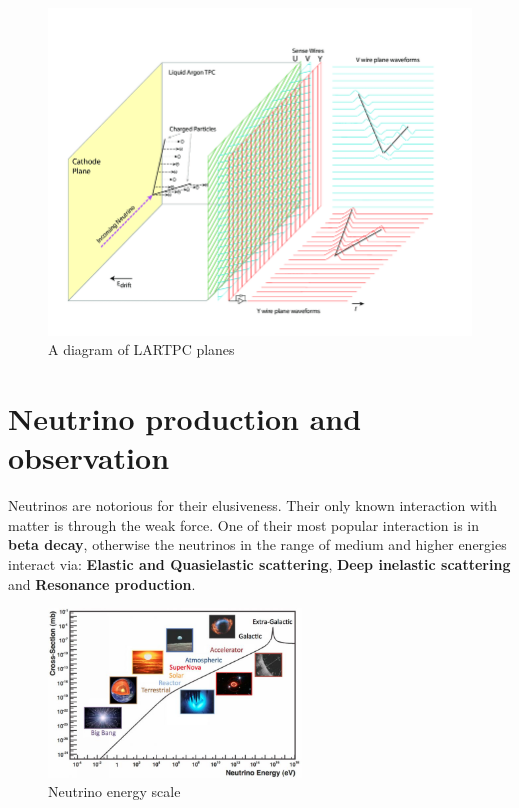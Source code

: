 \begin{figure}[H]
\centering
\includegraphics[width=8.\textwidth]{figures/chapter6/Operational-principle-of-the-MicroBooNE-LArTPC.png}
\caption{A diagram of LARTPC planes \cite{microboone}}
\label{fig:lartpc-grids}
\end{figure}

\section{Neutrino production and observation}

Neutrinos are notorious for their elusiveness. Their only known interaction with matter is through the weak force.
One of their most popular interaction is in \textbf{beta decay}, otherwise the neutrinos in the range of medium and higher energies interact via: \textbf{Elastic and Quasielastic scattering}, \textbf{Deep inelastic scattering} and \textbf{Resonance production}.

\begin{figure}[H]
\centering
\includegraphics[width=0.6\textwidth]{figures/chapter6/neutrino-energy-scale.jpg}
\caption{Neutrino energy scale \cite{RevModPhys.84.1307}}
\label{fig:neutrino-energy}
\end{figure}


